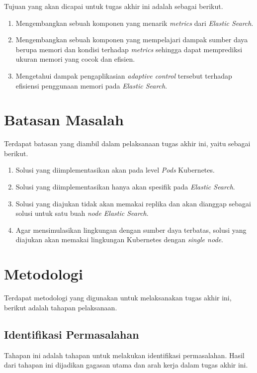 Tujuan yang akan dicapai untuk tugas akhir ini adalah sebagai berikut.

\begin{enumerate}
    \item Mengembangkan sebuah komponen yang menarik \textit{metrics} dari \textit{Elastic Search}.

    \item Mengembangkan sebuah komponen yang mempelajari dampak sumber daya berupa memori dan kondisi terhadap \textit{metrics} sehingga dapat memprediksi ukuran memori yang cocok dan efisien.

    \item Mengetahui dampak pengaplikasian \textit{adaptive control} tersebut terhadap efisiensi penggunaan memori pada \textit{Elastic Search}.
\end{enumerate}

\section{Batasan Masalah}

Terdapat batasan yang diambil dalam pelaksanaan tugas akhir ini, yaitu sebagai berikut.

\begin{enumerate}
    \item Solusi yang diimplementasikan akan pada level \textit{Pods} Kubernetes.
    \item Solusi yang diimplementasikan hanya akan spesifik pada \textit{Elastic Search}.
    \item Solusi yang diajukan tidak akan memakai replika dan akan dianggap sebagai solusi untuk satu buah \textit{node Elastic Search}.
    \item Agar mensimulasikan lingkungan dengan sumber daya terbatas, solusi yang diajukan akan memakai lingkungan Kubernetes dengan \textit{single node}.
 \end{enumerate}

\section{Metodologi}

Terdapat metodologi yang digunakan untuk melaksanakan tugas akhir ini, berikut adalah tahapan pelaksanaan.
\subsection{Identifikasi Permasalahan}
Tahapan ini adalah tahapan untuk melakukan identifikasi permasalahan. Hasil dari tahapan ini dijadikan gagasan utama dan arah kerja dalam tugas akhir ini.
